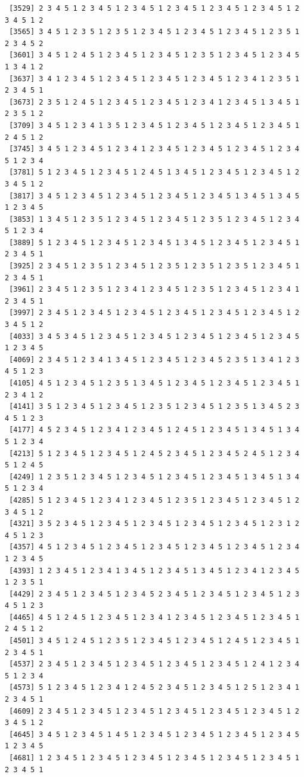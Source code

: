 \documentclass[
  11pt,
]{book}
\begin{document}
\begin{verbatim}
 [3529] 2 3 4 5 1 2 3 4 5 1 2 3 4 5 1 2 3 4 5 1 2 3 4 5 1 2 3 4 5 1 2 3 4 5 1 2
 [3565] 3 4 5 1 2 3 5 1 2 3 5 1 2 3 4 5 1 2 3 4 5 1 2 3 4 5 1 2 3 5 1 2 3 4 5 2
 [3601] 3 4 5 1 2 4 5 1 2 3 4 5 1 2 3 4 5 1 2 3 5 1 2 3 4 5 1 2 3 4 5 1 3 4 1 2
 [3637] 3 4 1 2 3 4 5 1 2 3 4 5 1 2 3 4 5 1 2 3 4 5 1 2 3 4 1 2 3 5 1 2 3 4 5 1
 [3673] 2 3 5 1 2 4 5 1 2 3 4 5 1 2 3 4 5 1 2 3 4 1 2 3 4 5 1 3 4 5 1 2 3 5 1 2
 [3709] 3 4 5 1 2 3 4 1 3 5 1 2 3 4 5 1 2 3 4 5 1 2 3 4 5 1 2 3 4 5 1 2 4 5 1 2
 [3745] 3 4 5 1 2 3 4 5 1 2 3 4 1 2 3 4 5 1 2 3 4 5 1 2 3 4 5 1 2 3 4 5 1 2 3 4
 [3781] 5 1 2 3 4 5 1 2 3 4 5 1 2 4 5 1 3 4 5 1 2 3 4 5 1 2 3 4 5 1 2 3 4 5 1 2
 [3817] 3 4 5 1 2 3 4 5 1 2 3 4 5 1 2 3 4 5 1 2 3 4 5 1 3 4 5 1 3 4 5 1 2 3 4 5
 [3853] 1 3 4 5 1 2 3 5 1 2 3 4 5 1 2 3 4 5 1 2 3 5 1 2 3 4 5 1 2 3 4 5 1 2 3 4
 [3889] 5 1 2 3 4 5 1 2 3 4 5 1 2 3 4 5 1 3 4 5 1 2 3 4 5 1 2 3 4 5 1 2 3 4 5 1
 [3925] 2 3 4 5 1 2 3 5 1 2 3 4 5 1 2 3 5 1 2 3 5 1 2 3 5 1 2 3 4 5 1 2 3 4 5 1
 [3961] 2 3 4 5 1 2 3 5 1 2 3 4 1 2 3 4 5 1 2 3 5 1 2 3 4 5 1 2 3 4 1 2 3 4 5 1
 [3997] 2 3 4 5 1 2 3 4 5 1 2 3 4 5 1 2 3 4 5 1 2 3 4 5 1 2 3 4 5 1 2 3 4 5 1 2
 [4033] 3 4 5 3 4 5 1 2 3 4 5 1 2 3 4 5 1 2 3 4 5 1 2 3 4 5 1 2 3 4 5 1 2 3 4 5
 [4069] 2 3 4 5 1 2 3 4 1 3 4 5 1 2 3 4 5 1 2 3 4 5 2 3 5 1 3 4 1 2 3 4 5 1 2 3
 [4105] 4 5 1 2 3 4 5 1 2 3 5 1 3 4 5 1 2 3 4 5 1 2 3 4 5 1 2 3 4 5 1 2 3 4 1 2
 [4141] 3 5 1 2 3 4 5 1 2 3 4 5 1 2 3 5 1 2 3 4 5 1 2 3 5 1 3 4 5 2 3 4 5 1 2 3
 [4177] 4 5 2 3 4 5 1 2 3 4 1 2 3 4 5 1 2 4 5 1 2 3 4 5 1 3 4 5 1 3 4 5 1 2 3 4
 [4213] 5 1 2 3 4 5 1 2 3 4 5 1 2 4 5 2 3 4 5 1 2 3 4 5 2 4 5 1 2 3 4 5 1 2 4 5
 [4249] 1 2 3 5 1 2 3 4 5 1 2 3 4 5 1 2 3 4 5 1 2 3 4 5 1 3 4 5 1 3 4 5 1 2 3 4
 [4285] 5 1 2 3 4 5 1 2 3 4 1 2 3 4 5 1 2 3 5 1 2 3 4 5 1 2 3 4 5 1 2 3 4 5 1 2
 [4321] 3 5 2 3 4 5 1 2 3 4 5 1 2 3 4 5 1 2 3 4 5 1 2 3 4 5 1 2 3 1 2 4 5 1 2 3
 [4357] 4 5 1 2 3 4 5 1 2 3 4 5 1 2 3 4 5 1 2 3 4 5 1 2 3 4 5 1 2 3 4 1 2 3 4 5
 [4393] 1 2 3 4 5 1 2 3 4 1 3 4 5 1 2 3 4 5 1 3 4 5 1 2 3 4 1 2 3 4 5 1 2 3 5 1
 [4429] 2 3 4 5 1 2 3 4 5 1 2 3 4 5 2 3 4 5 1 2 3 4 5 1 2 3 4 5 1 2 3 4 5 1 2 3
 [4465] 4 5 1 2 4 5 1 2 3 4 5 1 2 3 4 1 2 3 4 5 1 2 3 4 5 1 2 3 4 5 1 2 4 5 1 2
 [4501] 3 4 5 1 2 4 5 1 2 3 5 1 2 3 4 5 1 2 3 4 5 1 2 4 5 1 2 3 4 5 1 2 3 4 5 1
 [4537] 2 3 4 5 1 2 3 4 5 1 2 3 4 5 1 2 3 4 5 1 2 3 4 5 1 2 4 1 2 3 4 5 1 2 3 4
 [4573] 5 1 2 3 4 5 1 2 3 4 1 2 4 5 2 3 4 5 1 2 3 4 5 1 2 5 1 2 3 4 1 2 3 4 5 1
 [4609] 2 3 4 5 1 2 3 4 5 1 2 3 4 5 1 2 3 4 5 1 2 3 4 5 1 2 3 4 5 1 2 3 4 5 1 2
 [4645] 3 4 5 1 2 3 4 5 1 4 5 1 2 3 4 5 1 2 3 4 5 1 2 3 4 5 1 2 3 4 5 1 2 3 4 5
 [4681] 1 2 3 4 5 1 2 3 4 5 1 2 3 4 5 1 2 3 4 5 1 2 3 4 5 1 2 3 4 5 1 2 3 4 5 1

\end{verbatim}
\end{document}
